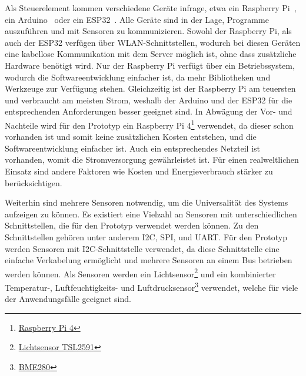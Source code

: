 Als Steuerelement kommen verschiedene Geräte infrage, etwa ein Raspberry Pi~\cite{RaspberryPi}, ein Arduino~\cite{Arduino} oder ein ESP32~\cite{ESP32}.
Alle Geräte sind in der Lage, Programme auszuführen und mit Sensoren zu kommunizieren.
Sowohl der Raspberry Pi, als auch der ESP32 verfügen über WLAN-Schnittstellen, wodurch bei diesen Geräten eine kabellose Kommunikation mit dem Server möglich ist, ohne dass zusätzliche Hardware benötigt wird.
Nur der Raspberry Pi verfügt über ein Betriebssystem, wodurch die Softwareentwicklung einfacher ist, da mehr Bibliotheken und Werkzeuge zur Verfügung stehen.
Gleichzeitig ist der Raspberry Pi am teuersten und verbraucht am meisten Strom, weshalb der Arduino und der ESP32 für die entsprechenden Anforderungen besser geeignet sind.
In Abwägung der Vor- und Nachteile wird für den Prototyp ein Raspberry Pi 4\footnote{\href{https://www.raspberrypi.com/products/raspberry-pi-4-model-b/specifications/}{Raspberry Pi 4}} verwendet, da dieser schon vorhanden ist und somit keine zusätzlichen Kosten entstehen, und die Softwareentwicklung einfacher ist.
Auch ein entsprechendes Netzteil ist vorhanden, womit die Stromversorgung gewährleistet ist.
Für einen realweltlichen Einsatz sind andere Faktoren wie Kosten und Energieverbrauch stärker zu berücksichtigen.

Weiterhin sind mehrere Sensoren notwendig, um die Universalität des Systems aufzeigen zu können.
Es existiert eine Vielzahl an Sensoren mit unterschiedlichen Schnittstellen, die für den Prototyp verwendet werden können.
Zu den Schnittstellen gehören unter anderem I2C, SPI, und UART.
Für den Prototyp werden Sensoren mit I2C-Schnittstelle verwendet, da diese Schnittstelle eine einfache Verkabelung ermöglicht und mehrere Sensoren an einem Bus betrieben werden können.
Als Sensoren werden ein Lichtsensor\footnote{\href{https://cdn-shop.adafruit.com/datasheets/TSL25911_Datasheet_EN_v1.pdf}{Lichtsensor TSL2591}} und ein kombinierter Temperatur-, Luftfeuchtigkeits- und Luftdrucksensor\footnote{\href{https://www.bosch-sensortec.com/products/environmental-sensors/humidity-sensors-bme280/}{BME280}} verwendet, welche für viele der Anwendungsfälle geeignet sind.



